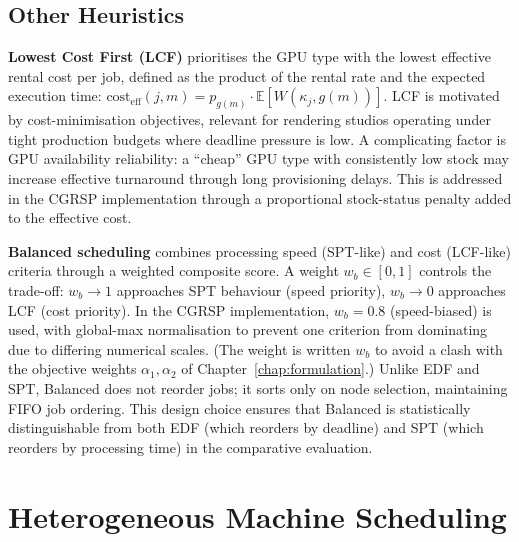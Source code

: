 \subsection{Other Heuristics}
\label{ssec:other-heuristics}

\textbf{Lowest Cost First (LCF)} prioritises the GPU type with the lowest effective rental cost per job, defined as the product of the rental rate and the expected execution time: $\text{cost}_{\text{eff}}(j, m) = p_{g(m)} \cdot \mathbb{E}[W(\kappa_j, g(m))]$. LCF is motivated by cost-minimisation objectives, relevant for rendering studios operating under tight production budgets where deadline pressure is low. A complicating factor is GPU availability reliability: a ``cheap'' GPU type with consistently low stock may increase effective turnaround through long provisioning delays. This is addressed in the CGRSP implementation through a proportional stock-status penalty added to the effective cost.

\textbf{Balanced scheduling} combines processing speed (SPT-like) and cost (LCF-like) criteria through a weighted composite score. A weight $w_b \in [0, 1]$ controls the trade-off: $w_b \to 1$ approaches SPT behaviour (speed priority), $w_b \to 0$ approaches LCF (cost priority). In the CGRSP implementation, $w_b = 0.8$ (speed-biased) is used, with global-max normalisation to prevent one criterion from dominating due to differing numerical scales. (The weight is written $w_b$ to avoid a clash with the objective weights $\alpha_1, \alpha_2$ of Chapter~\ref{chap:formulation}.) Unlike EDF and SPT, Balanced does not reorder jobs; it sorts only on node selection, maintaining FIFO job ordering. This design choice ensures that Balanced is statistically distinguishable from both EDF (which reorders by deadline) and SPT (which reorders by processing time) in the comparative evaluation.

\section{Heterogeneous Machine Scheduling}
\label{sec:heterogeneous-machine-scheduling}

